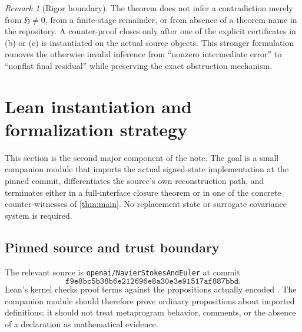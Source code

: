 \documentclass[12pt]{article}
\theoremstyle{plain}
\theoremstyle{definition}
\theoremstyle{remark}
\newtheorem{remark}[theorem]{Remark}
\newcommand{\Hidden}{\mathfrak H}
\begin{document}
\begin{remark}[Rigor boundary]
The theorem does not infer a contradiction merely from \(\Hidden\neq0\), from a finite-stage remainder, or from absence of a theorem name in the repository. A counter-proof closes only after one of the explicit certificates in (b) or (c) is instantiated on the actual source objects. This stronger formulation removes the otherwise invalid inference from ``nonzero intermediate error'' to ``nonflat final residual'' while preserving the exact obstruction mechanism.
\end{remark}

\section{Lean instantiation and formalization strategy}\label{sec:lean-instantiation}
This section is the second major component of the note. The goal is a small companion module that imports the actual signed-state implementation at the pinned commit, differentiates the source's own reconstruction path, and terminates either in a full-interface closure theorem or in one of the concrete counter-witnesses of \cref{thm:main}. No replacement state or surrogate covariance system is required.

\subsection{Pinned source and trust boundary}
The relevant source is \texttt{openai/NavierStokesAndEuler} at commit
\[
\texttt{f9e8bc5b38b6e212696e8a30e3e91517af887bbd}.
\]
Lean's kernel checks proof terms against the propositions actually encoded \cite{deMouraEtAl2015,Lean4Reference}. The companion module should therefore prove ordinary propositions about imported definitions; it should not treat metaprogram behavior, comments, or the absence of a declaration as mathematical evidence.
\end{document}
